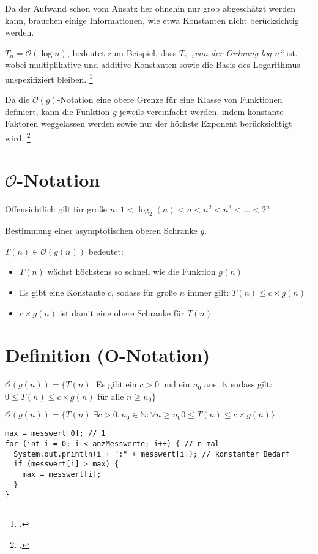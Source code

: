 \documentclass{lehramt-informatik-haupt}
\begin{document}
Da der Aufwand schon vom Ansatz her ohnehin nur grob abgeschätzt werden
kann, brauchen einige Informationen, wie etwa Konstanten nicht
berücksichtig werden.

 $T_n = \mathcal{O}(\log n)$, bedeutet zum Beispiel, dass $T_n$
\emph{„von der Ordnung log n“} ist, wobei multiplikative und additive
Konstanten sowie die Basis des Logarithmus unspezifiziert bleiben.
\footcite[Seite 200 (PDF 2018)]{saake}

Da die $\mathcal{O}(g)$-Notation eine obere Grenze für eine Klasse von
Funktionen definiert, kann die Funktion $g$ jeweils vereinfacht werden,
indem konstante Faktoren weggelassen werden sowie nur der höchste
Exponent berücksichtigt wird.
\footcite[Seite 201 (PDF 2019)]{saake}

\section{$\mathcal{O}$-Notation}

Offensichtlich gilt für große $n$:
$1 < \log_2(n) < n < n^2 < n^3 < ... < 2^n$

Bestimmung einer asymptotischen oberen Schranke $g$.

$T(n) \in \mathcal{O}(g(n))$ bedeutet:

\begin{itemize}
\item $T(n)$ wächst höchstens so schnell wie die Funktion $g(n)$

\item Es gibt eine Konstante $c$, sodass für große $n$ immer gilt: $T(n)
\leq c \times g(n)$

\item $c \times g(n)$ ist damit eine obere Schranke für $T(n)$
\end{itemize}

\section{Definition (O-Notation)}

$\mathcal{O}(g(n)) = \{T(n)|$
Es gibt ein
$c > 0$
und ein
$n_0$
aus,
$\mathbb{N}$
sodass gilt:
$0 \leq T(n) \leq c \times g(n)$
für alle
$n \geq n_0\}$

$\mathcal{O}(g(n)) = \{T(n)|
\exists
c > 0,
n_0 \in \mathbb{N}:
\forall n \geq n_0 0 \leq T(n) \leq c \times g(n)
\}$

\begin{verbatim}
max = messwert[0]; // 1
for (int i = 0; i < anzMesswerte; i++) { // n-mal
  System.out.println(i + ":" + messwert[i]); // konstanter Bedarf
  if (messwert[i] > max) {
    max = messwert[i];
  }
}
\end{verbatim}
\end{document}
